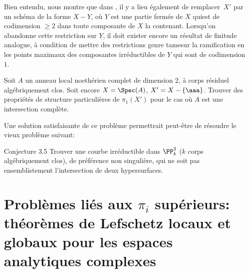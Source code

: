 Bien entendu,  nous montre que dans , il y a lieu \'egalement de remplacer~$X'$ par un sch\'ema de la forme $X-Y$, o\`u $Y$ est une partie ferm\'ee de $X$ qui\pageoriginale est de codimension $\ge 2$ dans toute composante de $X$ la contenant. Lorsqu'on abandonne cette restriction sur $Y$, il doit exister encore un r\'esultat de finitude analogue, \`a condition de mettre des restrictions genre \og tame\fg sur la ramification en les points maximaux des composantes irr\'eductibles de $Y$ qui sont de codimension $1$.

\begin{probleme} \label{XIII.3.4}
Soit $A$ un anneau local noeth\'erien complet de dimension $2$, \`a corps r\'esiduel alg\'ebriquement clos. Soit encore $X=\Spec(A)$, $X'=X-\{\aaa\}$. Trouver des propri\'et\'es de structure particuli\`eres de $\pi_1(X')$ pour le cas o\`u $A$ est une intersection compl\`ete.
\end{probleme}

Une solution satisfaisante de ce probl\`eme permettrait peut-\^etre de r\'esoudre le vieux probl\`eme suivant:

\label{XIII.3.5}
\begin{enonce*}{Conjecture 3.5\ndemark} Trouver une courbe irr\'eductible dans $\PP^3_k$ ($k$ corps alg\'ebriquement clos), de pr\'ef\'erence non singuli\`ere, qui ne soit pas ensemblistement l'intersection de deux hypersurfaces. 
\end{enonce*}

\section[Probl\`emes li\'es aux $\pi_i$ sup\'erieurs]{Probl\`emes li\'es aux $\pi_i$ sup\'erieurs: th\'eor\`emes de Lefschetz locaux et globaux pour les espaces analytiques complexes\protect\ndemark} \label{XIII.4}

